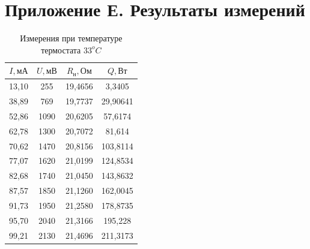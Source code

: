 \section{Приложение Е. Результаты измерений}

    \begin{table}[!ht]
        \begin{minipage}{.42\linewidth}
            \centering
            \begin{tabular}{|c|c|c|c|}
                \hline

                $I, \text{мА}$ & $U, \text{мВ}$ &  $R_\text{н}, \text{Ом}$ & $Q, \text{Вт}$\\ \hline
                13,10	& 255	& 19,4656	& 3,3405 \\ \hline
                38,89	& 769	& 19,7737	& 29,90641 \\ \hline
                52,86	& 1090	& 20,6205	& 57,6174 \\ \hline
                62,78	& 1300	& 20,7072	& 81,614 \\ \hline
                70,62	& 1470	& 20,8156	& 103,8114 \\ \hline
                77,07	& 1620	& 21,0199	& 124,8534 \\ \hline
                82,68	& 1740	& 21,0450	& 143,8632 \\ \hline
                87,57	& 1850	& 21,1260	& 162,0045 \\ \hline
                91,73	& 1950	& 21,2580	& 178,8735 \\ \hline
                95,70	& 2040	& 21,3166	& 195,228 \\ \hline
                99,21	& 2130	& 21,4696	& 211,3173 \\ \hline

            \end{tabular}
            \caption{   Измерения при температуре термостата $33^oC$}
            \label{table_61}
        \end{minipage}
    \end{table}

